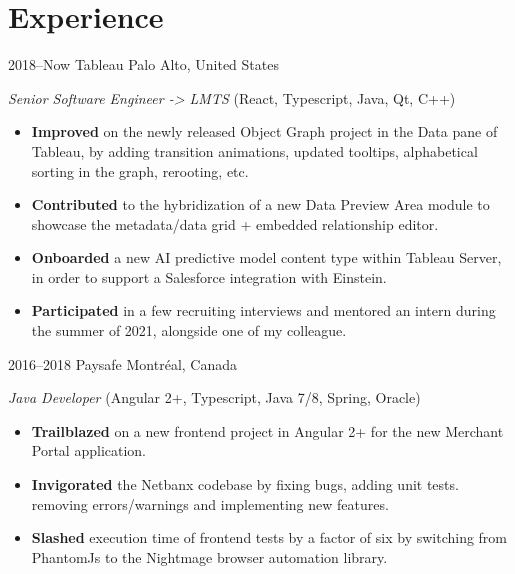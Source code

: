 \documentclass[]{friggeri-cv}
\begin{document}
\section{Experience}
\begin{entrylist}

\entry
{2018--Now}
{Tableau}
{Palo Alto, United States}
{\emph{Senior Software Engineer -> LMTS} (React, Typescript, Java, Qt, C++)
\begin{itemize}
	\item \textbf{Improved} on the newly released Object Graph project in the Data pane of Tableau, by adding transition animations, updated tooltips, alphabetical sorting in the graph, rerooting, etc.
	\item \textbf{Contributed} to the hybridization of a new Data Preview Area module to showcase the metadata/data grid + embedded relationship editor. 
	\item \textbf{Onboarded} a new AI predictive model content type within Tableau Server, in order to support a Salesforce integration with Einstein.
	\item \textbf{Participated} in a few recruiting interviews and mentored an intern during the summer of 2021, alongside one of my colleague.
\end{itemize}
}


\entry
{2016--2018}
{Paysafe}
{Montréal, Canada}
{\emph{Java Developer} (Angular 2+, Typescript, Java 7/8, Spring, Oracle)
\begin{itemize}
	\item \textbf{Trailblazed} on a new frontend project in Angular 2+ for the new Merchant Portal application.
	\item \textbf{Invigorated} the Netbanx codebase by fixing bugs, adding unit tests. removing errors/warnings and implementing new features.
	\item \textbf{Slashed} execution time of frontend tests by a factor of six by switching from PhantomJs to the Nightmage browser automation library.
\end{itemize}
}



\end{entrylist}
\end{document}
